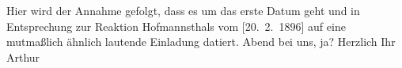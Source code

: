 \begin{ledgroupsized}[t]{13cm}
{{{                  Hier wird der Annahme gefolgt, dass es um das erste Datum geht und in Entsprechung
                  zur Reaktion Hofmannsthals vom [20. 2. 1896] auf eine mutmaßlich ähnlich lautende Einladung
                  datiert.}}}\label{K_L00534_1h}{ }Abend bei uns, ja?\pend
           \pstart Herzlich Ihr \spacefill\mbox{Arthur}\pend{}\endnumbering{}\end{ledgroupsized}  \newcommand{\dateiname}{L00534}\newcommand{\titel}{Arthur Schnitzler an Richard Beer-Hofmann, [19. 2. 1896?]}\newcommand{\editorInnen}{Martin Anton Müller und Gerd-Hermann Susen}
      